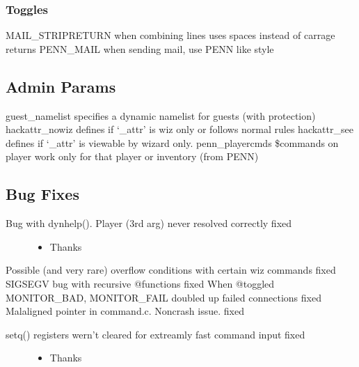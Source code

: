 \documentclass[letterpaper,10pt,english]{sphinxmanual}
\begin{document}
\subsubsection{Toggles}
\label{\detokenize{changelog:id56}}
\sphinxAtStartPar
MAIL\_STRIPRETURN \sphinxhyphen{} when combining lines uses spaces instead of carrage returns
PENN\_MAIL \sphinxhyphen{} when sending mail, use PENN like style


\subsection{Admin Params}
\label{\detokenize{changelog:id57}}
\sphinxAtStartPar
guest\_namelist \sphinxhyphen{} specifies a dynamic namelist for guests (with protection)
hackattr\_nowiz \sphinxhyphen{} defines if ‘\_attr’ is wiz only or follows normal rules
hackattr\_see \sphinxhyphen{} defines if ‘\_attr’ is viewable by wizard only.
penn\_playercmds \sphinxhyphen{} \$commands on player work only for that player or inventory (from PENN)


\subsection{Bug Fixes}
\label{\detokenize{changelog:id58}}\begin{description}
\item[{Bug with dynhelp().  Player (3rd arg) never resolved correctly \sphinxhyphen{} fixed}] \leavevmode\begin{itemize}
\item {} 
\sphinxAtStartPar
Thanks 

\end{itemize}

\end{description}

\sphinxAtStartPar
Possible (and very rare) overflow conditions with certain wiz commands \sphinxhyphen{} fixed
SIGSEGV bug with recursive @functions \sphinxhyphen{} fixed
When @toggled MONITOR\_BAD, MONITOR\_FAIL doubled up failed connections \sphinxhyphen{} fixed
Malaligned pointer in command.c.  Non\sphinxhyphen{}crash issue.  \sphinxhyphen{} fixed
\begin{description}
\item[{setq() registers wern’t cleared for extreamly fast command input \sphinxhyphen{} fixed}] \leavevmode\begin{itemize}
\item {} 
\sphinxAtStartPar
Thanks 

\end{itemize}

\end{description}
\end{document}
